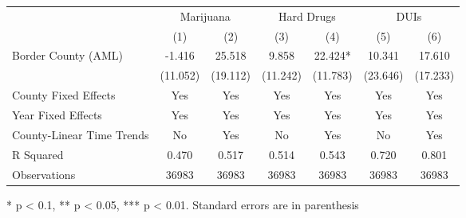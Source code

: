 \setlength{\LTpost}{0mm}
\begin{longtable}{lcccccc}
\hline\hline
 & \multicolumn{2}{c}{Marijuana} & \multicolumn{2}{c}{Hard Drugs} & \multicolumn{2}{c}{DUIs} \\ 
\cmidrule(lr){2-3} \cmidrule(lr){4-5} \cmidrule(lr){6-7}
  & (1) & (2) & (3) & (4) & (5) & (6) \\ 
\midrule
Border County (AML) & -1.416 & 25.518 & 9.858 & 22.424* & 10.341 & 17.610 \\ 
 & (11.052) & (19.112) & (11.242) & (11.783) & (23.646) & (17.233) \\ 
County Fixed Effects & Yes & Yes & Yes & Yes & Yes & Yes \\ 
Year Fixed Effects & Yes & Yes & Yes & Yes & Yes & Yes \\ 
County-Linear Time Trends & No & Yes & No & Yes & No & Yes \\ 
R Squared & 0.470 & 0.517 & 0.514 & 0.543 & 0.720 & 0.801 \\ 
Observations & 36983 & 36983 & 36983 & 36983 & 36983 & 36983 \\ 
\bottomrule
\end{longtable}
\begin{minipage}{\linewidth}
* p < 0.1, ** p < 0.05, *** p < 0.01. Standard errors are in parenthesis\\
\end{minipage}

